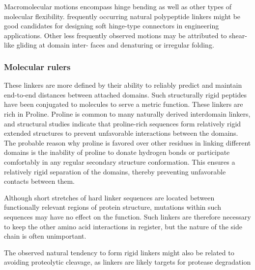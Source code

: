 Macromolecular motions encompass hinge bending
as well as other types of molecular flexibility.
frequently occurring natural
polypeptide linkers might be good candidates for
designing soft hinge-type connectors in engineering
applications. Other less frequently observed motions
may be attributed to shear-like gliding at domain inter-
faces and denaturing or irregular folding.



\subsubsection{Molecular rulers}
These linkers are more defined by their ability to reliably predict and maintain end-to-end distances between attached domains. 
Such structurally rigid peptides have been conjugated to molecules to serve a metric function.
These linkers are rich in Proline. 
Proline is common to many naturally derived interdomain linkers, and structural studies indicate that proline-rich sequences form relatively rigid extended structures to prevent unfavorable interactions between the domains.
The probable reason why proline is favored over other residues in linking different domains is the inability of proline to donate hydrogen bonds or participate comfortably in any regular secondary structure conformation. This ensures a relatively rigid separation of the domains, thereby preventing unfavorable contacts between them.

Although short stretches of hard linker sequences are located between functionally relevant regions of protein structure, mutations within such sequences may have no effect on the function.  
Such linkers are therefore necessary to keep the other amino acid interactions in register, but the nature of the side chain is often unimportant.

The observed natural tendency to form rigid linkers might also
be related to avoiding proteolytic cleavage, as linkers are likely
targets for protease degradation

